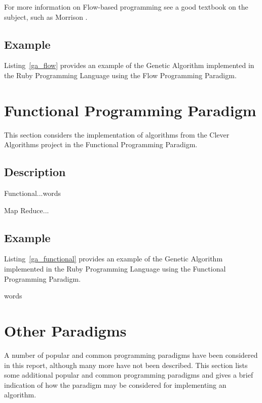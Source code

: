 \documentclass[a4paper, 11pt]{article}
\begin{document}
For more information on Flow-based programming see a good textbook on the subject, such as Morrison \cite{Morrison2010}.

\subsection{Example}
Listing~\ref{ga_flow} provides an example of the Genetic Algorithm implemented in the Ruby Programming Language using the Flow Programming Paradigm.



\section{Functional Programming Paradigm}
This section considers the implementation of algorithms from the Clever Algorithms project in the Functional Programming Paradigm.

\subsection{Description}
Functional...words

Map Reduce...

\subsection{Example}
Listing~\ref{ga_functional} provides an example of the Genetic Algorithm implemented in the Ruby Programming Language using the Functional Programming Paradigm.

words




\section{Other Paradigms}
A number of popular and common programming paradigms have been considered in this report, although many more have not been described. This section lists some additional popular and common programming paradigms and gives a brief indication of how the paradigm may be considered for implementing an algorithm.
\end{document}
